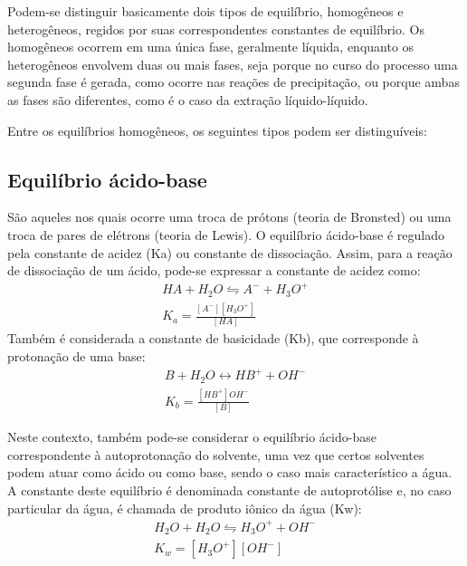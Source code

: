 Podem-se distinguir basicamente dois tipos de equilíbrio, homogêneos e heterogêneos, regidos por suas correspondentes constantes de equilíbrio. Os homogêneos ocorrem em uma única fase, geralmente líquida, enquanto os heterogêneos envolvem duas ou mais fases, seja porque no curso do processo uma segunda fase é gerada, como ocorre nas reações de precipitação, ou porque ambas as fases são diferentes, como é o caso da extração líquido-líquido.

Entre os equilíbrios homogêneos, os seguintes tipos podem ser distinguíveis:

\subsection*{Equilíbrio ácido-base}

\begin{definition}
    São aqueles nos quais ocorre uma troca de prótons (teoria de Bronsted) ou uma troca de pares de elétrons (teoria de Lewis). O equilíbrio ácido-base é regulado pela constante de acidez (Ka) ou constante de dissociação. Assim, para a reação de dissociação de um ácido, pode-se expressar a constante de acidez como:
    \begin{gather}
        HA + H_2O \leftrightharpoons A^- + H_3O^+ \\
        K_a = \frac{[A^-][H_3O^+]}{[HA]}
    \end{gather}
    Também é considerada a constante de basicidade (Kb), que corresponde à protonação de uma base:
    \begin{gather}
        B + H_2O \leftrightarrow HB^+ + OH^- \\
        K_b = \frac{[HB^+]{OH^-}}{[B]}
    \end{gather}
\end{definition}

\begin{definition}
    Neste contexto, também pode-se considerar o equilíbrio ácido-base correspondente à autoprotonação do solvente, uma vez que certos solventes podem atuar como ácido ou como base, sendo o caso mais característico a água. A constante deste equilíbrio é denominada constante de autoprotólise e, no caso particular da água, é chamada de produto iônico da água (Kw):
    \begin{gather}
        H_2O + H_2O \leftrightharpoons H_3O^+ + OH^- \\
        K_w = [H_3O^+][OH^-]
    \end{gather}
\end{definition}

